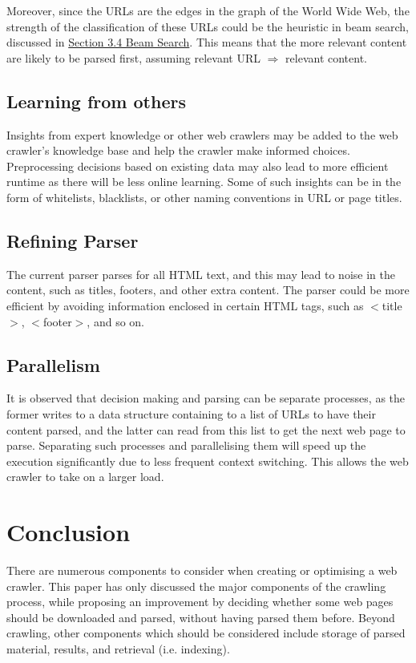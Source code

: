 \documentclass{article}
\begin{document}
Moreover, since the URLs are the edges in the graph of the World Wide Web, the strength of the classification of these URLs could be the heuristic in beam search, discussed in \hyperref[sec:3.4]{Section 3.4 Beam Search}. This means that the more relevant content are likely to be parsed first, assuming relevant URL $ \Rightarrow $ relevant content.

\subsection{Learning from others}
Insights from expert knowledge or other web crawlers may be added to the web crawler's knowledge base and help the crawler make informed choices. Preprocessing decisions based on existing data may also lead to more efficient runtime as there will be less online learning. Some of such insights can be in the form of whitelists, blacklists, or other naming conventions in URL or page titles.

\subsection{Refining Parser}
The current parser parses for all HTML text, and this may lead to noise in the content, such as titles, footers, and other extra content. The parser could be more efficient by avoiding information enclosed in certain HTML tags, such as $<$title$>$, $<$footer$>$, and so on.

\subsection{Parallelism}
It is observed that decision making and parsing can be separate processes, as the former writes to a data structure containing to a list of URLs to have their content parsed, and the latter can read from this list to get the next web page to parse. Separating such processes and parallelising them will speed up the execution significantly due to less frequent context switching. This allows the web crawler to take on a larger load.
\newpage

\section{Conclusion}
There are numerous components to consider when creating or optimising a web crawler. This paper has only discussed the major components of the crawling process, while proposing an improvement by deciding whether some web pages should be downloaded and parsed, without having parsed them before. Beyond crawling, other components which should be considered include storage of parsed material, results, and retrieval (i.e. indexing).
\newpage
\end{document}
